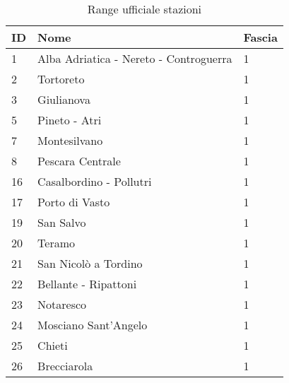 \begin{table}[t]
\centering
\caption{Range ufficiale stazioni}
\label{my-label}
\begin{tabular}{|p{1cm}|p{4cm}|p{2cm}|}
\hline
\rowcolor[HTML]{C0C0C0} 
ID  & Nome                                     & Fascia \\ \hline
\rowcolor[HTML]{9AFF99} 
1   & Alba Adriatica - Nereto - Controguerra   & 1      \\ \hline
\rowcolor[HTML]{9AFF99} 
2   & Tortoreto                                & 1      \\ \hline
\rowcolor[HTML]{9AFF99} 
3   & Giulianova                               & 1      \\ \hline
\rowcolor[HTML]{9AFF99} 
5   & Pineto - Atri                            & 1      \\ \hline
\rowcolor[HTML]{9AFF99} 
7   & Montesilvano                             & 1      \\ \hline
\rowcolor[HTML]{9AFF99} 
8   & Pescara Centrale                         & 1      \\ \hline
\rowcolor[HTML]{9AFF99} 
16  & Casalbordino - Pollutri                  & 1      \\ \hline
\rowcolor[HTML]{9AFF99} 
17  & Porto di Vasto                           & 1      \\ \hline
\rowcolor[HTML]{9AFF99} 
19  & San Salvo                                & 1      \\ \hline
\rowcolor[HTML]{9AFF99} 
20  & Teramo                                   & 1      \\ \hline
\rowcolor[HTML]{9AFF99} 
21  & San Nicolò a Tordino                     & 1      \\ \hline
\rowcolor[HTML]{9AFF99} 
22  & Bellante - Ripattoni                     & 1      \\ \hline
\rowcolor[HTML]{9AFF99} 
23  & Notaresco                                & 1      \\ \hline
\rowcolor[HTML]{9AFF99} 
24  & Mosciano Sant'Angelo                     & 1      \\ \hline
\rowcolor[HTML]{9AFF99} 
25  & Chieti                                   & 1      \\ \hline
\rowcolor[HTML]{9AFF99} 
26  & Brecciarola                              & 1      \\ \hline

\end{tabular}
\end{table}
